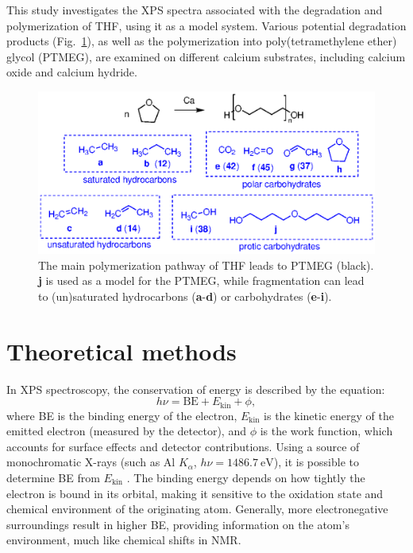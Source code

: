 \documentclass[journal=jpccck,manuscript=article]{achemso}
\begin{document}
This study investigates the XPS spectra associated with the degradation and polymerization of THF, using it as a model system. Various potential degradation products (Fig.~\ref{fig:THFdegradation}), as well as the polymerization into poly(tetramethylene ether) glycol (PTMEG), are examined on different calcium substrates, including calcium oxide and calcium hydride.


\begin{figure}
	\centering
	\includegraphics{Figure1}
	\caption{The main polymerization pathway of THF leads to PTMEG (black). \textbf{j} is used as a model for the PTMEG, while fragmentation can lead to (un)saturated hydrocarbons (\textbf{a}-\textbf{d}) or carbohydrates (\textbf{e}-\textbf{i}).}
	\label{fig:THFdegradation}
\end{figure}

\section{Theoretical methods}

In XPS spectroscopy, the conservation of energy is described by the equation:
\begin{equation}
	h\nu = \text{BE} + E_{\text{kin}} + \phi, \label{eq:xps}
\end{equation}
where BE is the binding energy of the electron, $E_{\text{kin}}$ is the kinetic energy of the emitted electron (measured by the detector), and $\phi$ is the work function, which accounts for surface effects and detector contributions. Using a source of monochromatic X-rays (such as Al $K_\alpha$, $h\nu = \SI{1486.7}{\electronvolt}$), it is possible to determine BE from $E_{\text{kin}}$ \cite{vinesPredictionCoreLevel2018}. The binding energy depends on how tightly the electron is bound in its orbital, making it sensitive to the oxidation state and chemical environment of the originating atom. Generally, more electronegative surroundings result in higher BE, providing information on the atom's environment, much like chemical shifts in NMR.
\end{document}
